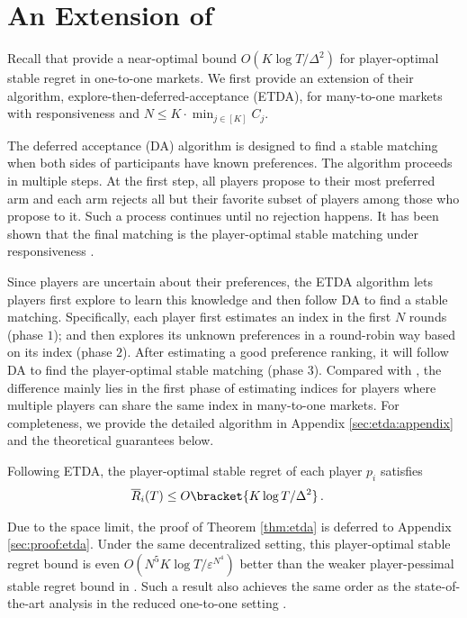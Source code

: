\section{An Extension of \citet{kong2023player}
}\label{sec:etgs}

Recall that \citet{kong2023player} provide a near-optimal bound $O(K\log T/\Delta^2)$ for player-optimal stable regret in one-to-one markets. We first provide an extension of their algorithm, explore-then-deferred-acceptance (ETDA), for many-to-one markets with responsiveness and $N\le K\cdot \min_{j\in[K]} C_j$. 

The deferred acceptance (DA) algorithm is designed to find a stable matching when both sides of participants have known preferences. The algorithm proceeds in multiple steps. At the first step, all players propose to their most preferred arm and each arm rejects all but their favorite subset of players among those who propose to it. Such a process continues until no rejection happens. It has been shown that the final matching is the player-optimal stable matching under responsiveness \citep{kelso1982job,roth1992two}. 



Since players are uncertain about their preferences, the ETDA algorithm lets players first explore to learn this knowledge and then follow DA to find a stable matching. 
Specifically, each player first estimates an index in the first $N$ rounds (phase $1$); and then explores its unknown preferences in a round-robin way based on its index (phase $2$). After estimating a good preference ranking, it will follow DA to find the player-optimal stable matching (phase $3$). 
Compared with \citet{kong2023player}, the difference mainly lies in the first phase of estimating indices for players where multiple players can share the same index in many-to-one markets. For completeness, we provide the detailed algorithm in Appendix \ref{sec:etda:appendix} and the theoretical guarantees below. 

 
\begin{theorem}\label{thm:etda}
   Following ETDA, 
   the player-optimal stable regret of each player $p_i$ satisfies
   \begin{align}
        \overline{R}_i(T) &\le O\bracket{K\log T/\Delta^2}  \,.
    \end{align}
\end{theorem}
Due to the space limit, the proof of Theorem \ref{thm:etda} is deferred to Appendix \ref{sec:proof:etda}. Under the same decentralized setting, this player-optimal stable regret bound is even $O(N^5K\log T/\varepsilon^{N^4})$ better than the weaker player-pessimal stable regret bound in \citet{wang2022bandit}. 
Such a result also achieves the same order as the state-of-the-art analysis in the reduced one-to-one setting \citep{kong2023player}. 



